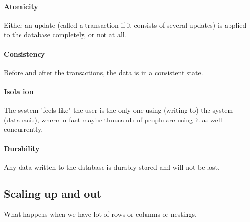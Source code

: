 \paragraph{Atomicity}Either an update (called a transaction if it consists of several updates) is applied to the database completely, or not at all.

\paragraph{Consistency} Before and after the transactions, the data is in a consistent state.

\paragraph{Isolation} The system "feels like" the user is the only one using (writing to) the system (databasis), where in fact maybe thousands of people are using it as well concurrently.

\paragraph{Durability} Any data written to the database is durably stored and will not be lost.


\subsection{Scaling up and out}
What happens when we have lot of rows or columns or nestings.

